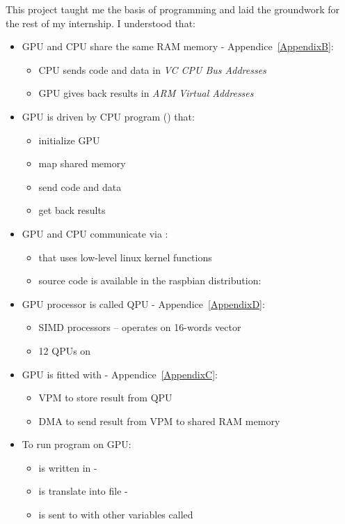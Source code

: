 This project taught me the basis of \vc{} programming and laid the groundwork for the rest of my internship. I understood that:
\begin{itemize}
	\item GPU and CPU share the same RAM memory - Appendice~\ref{AppendixB}:
		\begin{itemize}
			\item CPU sends code and data in \emph{VC CPU Bus Addresses}
			\item GPU gives back results in \emph{ARM Virtual Addresses}
		\end{itemize}
	\item GPU is driven by CPU program () that:
		\begin{itemize}
			\item initialize GPU
			\item map shared memory
			\item send code and data
			\item get back results
		\end{itemize}
	\item GPU and CPU communicate via :
		\begin{itemize}
			\item {} that uses low-level linux kernel functions
			\item source code is available in the raspbian distribution: \code{}
		\end{itemize}
	\item GPU processor is called QPU - Appendice~\ref{AppendixD}:
		\begin{itemize}
			\item SIMD processors -- operates on 16-words vector
			\item 12 QPUs on \vc
		\end{itemize}
	\item GPU is fitted with - Appendice~\ref{AppendixC}:
		\begin{itemize}
			\item VPM to store result from QPU
			\item DMA to send result from VPM to shared RAM memory
		\end{itemize}
	\item To run program on GPU:
		\begin{itemize}
			\item {} is written in  - 
			\item {} is translate into  file - 
			\item {} is sent to  with other variables called 
		\end{itemize}
\end{itemize}

